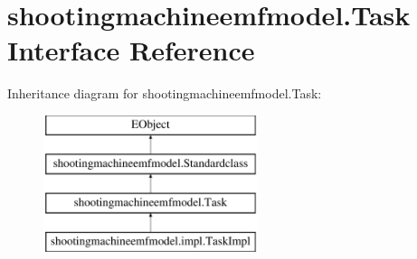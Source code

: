 \hypertarget{interfaceshootingmachineemfmodel_1_1_task}{\section{shootingmachineemfmodel.\-Task Interface Reference}
\label{interfaceshootingmachineemfmodel_1_1_task}
}
Inheritance diagram for shootingmachineemfmodel.\-Task\-:\begin{figure}[H]
\begin{center}
\leavevmode
\includegraphics[height=4.000000cm]{interfaceshootingmachineemfmodel_1_1_task}
\end{center}
\end{figure}
